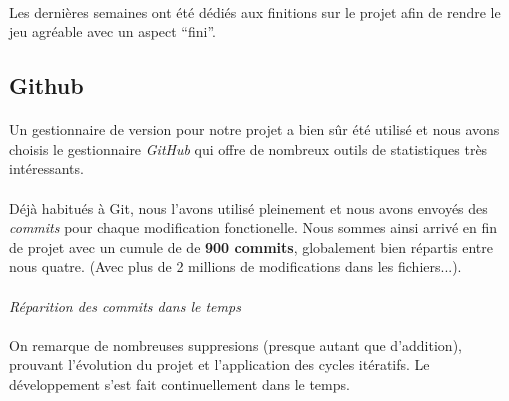 \paragraph{}
Les dernières semaines ont été dédiés aux finitions sur le projet afin de rendre le jeu agréable avec un aspect “fini”.

\subsection{Github}

\paragraph{}
Un gestionnaire de version pour notre projet a bien sûr été utilisé et nous avons choisis le gestionnaire \emph{GitHub} qui offre de nombreux outils de statistiques très intéressants.

\paragraph{}
Déjà habitués à Git, nous l'avons utilisé pleinement et nous avons envoyés des \emph{commits} pour chaque modification fonctionelle. Nous sommes ainsi arrivé en fin de projet avec un cumule de de \textbf{900 commits}, globalement bien répartis entre nous quatre. (Avec plus de 2 millions de modifications dans les fichiers...).

\paragraph{}
\noindent
{}
\begin{center}
\textit{Réparition des commits dans le temps}
\end{center}

\paragraph{}
On remarque de nombreuses suppresions (presque autant que d’addition), prouvant l’évolution du projet et l’application des cycles itératifs. Le développement s’est fait continuellement dans le temps.

